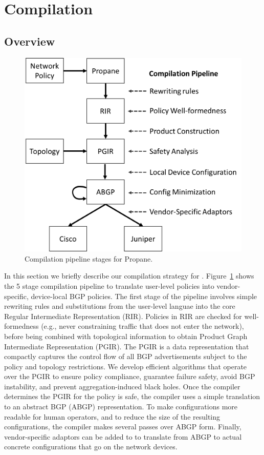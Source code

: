 \section{Compilation}
\label{sec:compilation}


\subsection{Overview}

\begin{figure}[t!]
\centering
\includegraphics[width=\columnwidth]{figures/pipeline}
\caption{Compilation pipeline stages for Propane.}
\label{fig:pipeline}
\end{figure}

In this section we briefly describe our compilation strategy for \sysname. Figure~\ref{fig:pipeline} shows the 5 stage compilation pipeline to translate user-level \sysname policies into vendor-specific, device-local BGP policies. The first stage of the pipeline involves simple rewriting rules and substitutions from the user-level languae into the core Regular Intermediate Representation (RIR). Policies in RIR are checked for well-formedness (e.g., never constraining traffic that does not enter the network), before being combined with topological information to obtain Product Graph Intermediate Representation (PGIR). The PGIR is a data representation that compactly captures the control flow of all BGP advertisements subject to the policy and topology restrictions. We develop efficient algorithms that operate over the PGIR to ensure policy compliance, guarantee failure safety, avoid BGP instability, and prevent aggregation-induced black holes. Once the compiler determines the PGIR for the policy is safe, the compiler uses a simple translation to an abstract BGP (ABGP) representation. To make configurations more readable for human operators, and to reduce the size of the resulting configurations, the \sysname compiler makes several passes over ABGP form. Finally, vendor-specific adaptors can be added to \sysname to translate from ABGP to actual concrete configurations that go on the network devices.


